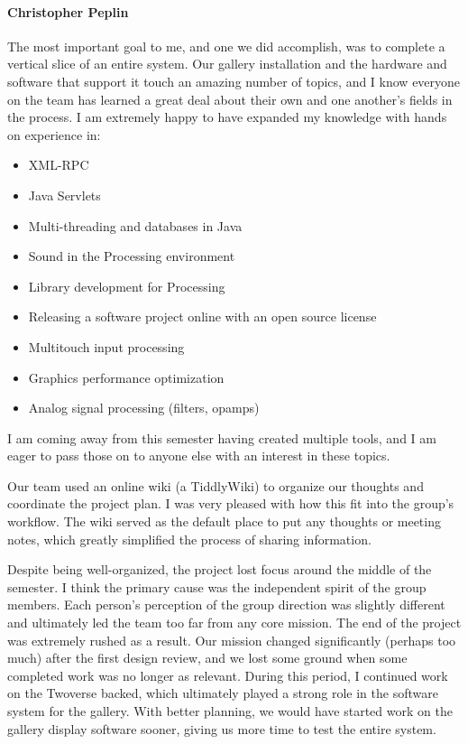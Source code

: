 \paragraph{Christopher Peplin}
The most important goal to me, and one we did accomplish, was to complete a vertical slice of an entire system. Our gallery installation and the hardware and software that support it touch an amazing number of topics, and I know everyone on the team has learned a great deal about their own and one another's fields in the process. I am extremely happy to have expanded my knowledge with hands on experience in:
\begin{itemize}
\item XML-RPC
\item Java Servlets
\item Multi-threading and databases in Java
\item Sound in the Processing environment
\item Library development for Processing
\item Releasing a software project online with an open source license
\item Multitouch input processing
\item Graphics performance optimization
\item Analog signal processing (filters, opamps)
\end{itemize}
I am coming away from this semester having created multiple tools, and I am eager to pass those on to anyone else with an interest in these topics. 


Our team used an online wiki (a TiddlyWiki) \cite{WIKI} to organize our thoughts and coordinate the project plan. I was very pleased with how this fit into the group's workflow. The wiki served as the default place to put any thoughts or meeting notes, which greatly simplified the process of sharing information.

Despite being well-organized, the project lost focus around the middle of the semester. I think the primary cause was the independent spirit of the group  members. Each person's perception of the group direction was slightly different and ultimately led the team too far from any core mission. The end of the project was extremely rushed as a result. Our mission changed significantly (perhaps too much) after the first design review, and we lost some ground when some completed work was no longer as relevant. During this period, I continued work on the Twoverse backed, which ultimately played a strong role in the software system for the gallery. With better planning, we would have started work on the gallery display software sooner, giving us more time to test the entire system. 

